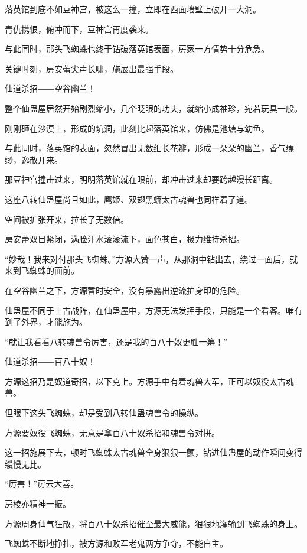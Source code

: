 
\begin{this_body}

落英馆到底不如豆神宫，被这么一撞，立即在西面墙壁上破开一大洞。

青仇携恨，俯冲而下，豆神宫再度袭来。

与此同时，那头飞蜘蛛也终于钻破落英馆表面，房家一方情势十分危急。

关键时刻，房安蕾尖声长啸，施展出最强手段。

仙道杀招――空谷幽兰！

整个仙蛊屋居然开始剧烈缩小，几个眨眼的功夫，就缩小成袖珍，宛若玩具一般。

刚刚砸在沙漠上，形成的坑洞，此刻比起落英馆来，仿佛是池塘与幼鱼。

与此同时，落英馆的表面，忽然冒出无数细长花瓣，形成一朵朵的幽兰，香气缥缈，逸散开来。

那豆神宫撞击过来，明明落英馆就在眼前，却冲击过来却要跨越漫长距离。

这座八转仙蛊屋尚且如此，鹰姬、双翅黑蟒太古魂兽也同样着了道。

空间被扩张开来，拉长了无数倍。

房安蕾双目紧闭，满脸汗水滚滚流下，面色苍白，极力维持杀招。

“妙哉！我来对付那头飞蜘蛛。”方源大赞一声，从那洞中钻出去，绕过一面后，就来到飞蜘蛛的面前。

在空谷幽兰之下，方源暂时安全，没有暴露出逆流护身印的危险。

仙蛊屋不同于上古战阵，在仙蛊屋中，方源无法发挥手段，只能是一个看客。唯有到了外界，才能施为。

“就让我看看八转魂兽令厉害，还是我的百八十奴更胜一筹！”

仙道杀招――百八十奴！

方源这招乃是奴道奇招，以下克上。方源手中有着魂兽大军，正可以奴役太古魂兽。

但眼下这头飞蜘蛛，却是受到八转仙蛊魂兽令的操纵。

方源要奴役飞蜘蛛，无意是拿百八十奴杀招和魂兽令对拼。

这一招施展下去，顿时飞蜘蛛太古魂兽全身狠狠一颤，钻进仙蛊屋的动作瞬间变得缓慢无比。

“厉害！”房云大喜。

房棱亦精神一振。

方源周身仙气狂散，将百八十奴杀招催至最大威能，狠狠地灌输到飞蜘蛛的身上。

飞蜘蛛不断地挣扎，被方源和败军老鬼两方争夺，不能自主。


\end{this_body}
